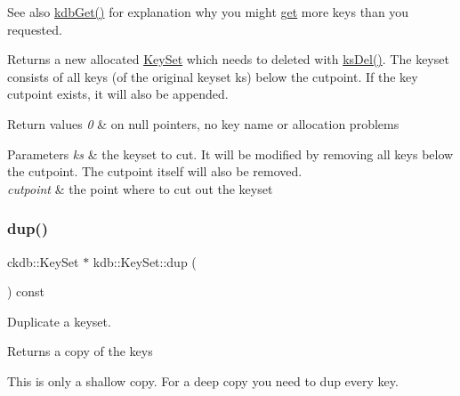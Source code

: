 \begin{DoxySeeAlso}{See also}
\mbox{\hyperlink{group__kdb_ga28e385fd9cb7ccfe0b2f1ed2f62453a1}{kdb\+Get()}} for explanation why you might \mbox{\hyperlink{classkdb_1_1KeySet_ad0b7d6498cf0b51ca6672704939a7f24}{get}} more keys than you requested.
\end{DoxySeeAlso}
\begin{DoxyReturn}{Returns}
a new allocated \mbox{\hyperlink{classkdb_1_1KeySet}{Key\+Set}} which needs to deleted with \mbox{\hyperlink{group__keyset_ga27e5c16473b02a422238c8d970db7ac8}{ks\+Del()}}. The keyset consists of all keys (of the original keyset ks) below the cutpoint. If the key cutpoint exists, it will also be appended. 
\end{DoxyReturn}

\begin{DoxyRetVals}{Return values}
{\em 0} & on null pointers, no key name or allocation problems \\
\hline
\end{DoxyRetVals}

\begin{DoxyParams}{Parameters}
{\em ks} & the keyset to cut. It will be modified by removing all keys below the cutpoint. The cutpoint itself will also be removed. \\
\hline
{\em cutpoint} & the point where to cut out the keyset \\
\hline
\end{DoxyParams}
\mbox{\label{classkdb_1_1KeySet_ad3f2b936d66729690e8a8a45b5074baa}} 
\subsubsection{\texorpdfstring{dup()}{dup()}}
{\footnotesize\ttfamily ckdb\+::\+Key\+Set $\ast$ kdb\+::\+Key\+Set\+::dup (\begin{DoxyParamCaption}{ }\end{DoxyParamCaption}) const\hspace{0.3cm}{\ttfamily [inline]}}



Duplicate a keyset. 

\begin{DoxyReturn}{Returns}
a copy of the keys
\end{DoxyReturn}
This is only a shallow copy. For a deep copy you need to dup every key.

